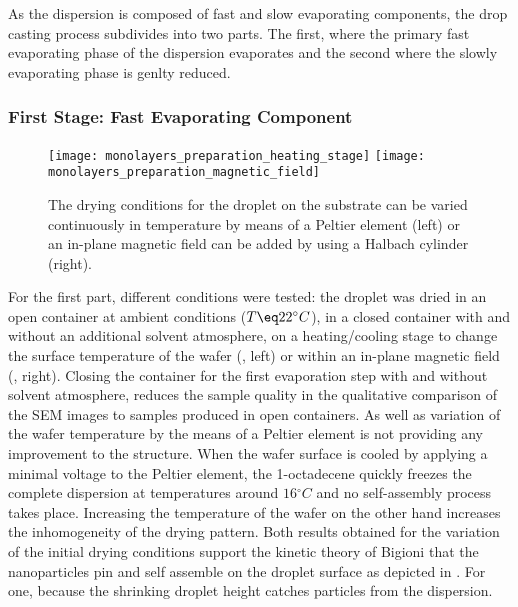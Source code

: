 \documentclass[\main/dresen_thesis.tex]{subfiles}
\begin{document}
  As the dispersion is composed of fast and slow evaporating components, the drop casting process subdivides into two parts.
  The first, where the primary fast evaporating phase of the dispersion evaporates and the second where the slowly evaporating phase is genlty reduced.

  \subsubsection{First Stage: Fast Evaporating Component}
    \begin{figure}[tb]
      \centering
      \texttt{[image: monolayers\_preparation\_heating\_stage]}
      \texttt{[image: monolayers\_preparation\_magnetic\_field]}
      \caption{\label{fig:monolayers:preparation:dryingConditions:varyConditions}The drying conditions for the droplet on the substrate can be varied continuously in temperature by means of a Peltier element (left) or an in-plane magnetic field can be added by using a Halbach cylinder (right).}
    \end{figure}  
    For the first part, different conditions were tested: the droplet was dried in an open container at ambient conditions ($T \eq 22 ^\circ C$), in a closed container with and without an additional solvent atmosphere, on a heating/cooling stage to change the surface temperature of the wafer (, left) or within an in-plane magnetic field (, right).
    Closing the container for the first evaporation step with and without solvent atmosphere, reduces the sample quality in the qualitative comparison of the SEM images to samples produced in open containers.
    As well as variation of the wafer temperature by the means of a Peltier element is not providing any improvement to the structure.
    When the wafer surface is cooled by applying a minimal voltage to the Peltier element, the 1-octadecene quickly freezes the complete dispersion at temperatures around $16 \unit{^\circ C}$ and no self-assembly process takes place.
    Increasing the temperature of the wafer on the other hand increases the inhomogeneity of the drying pattern.
    Both results obtained for the variation of the initial drying conditions support the kinetic theory of Bigioni \etal \cite{Bigioni_2006_Kinet} that the nanoparticles pin and self assemble on the droplet surface as depicted in .
    For one, because the shrinking droplet height catches particles from the dispersion.
\end{document}
